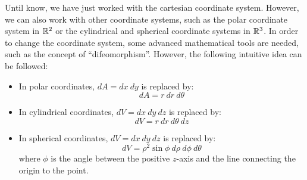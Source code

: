 Until know, we have just worked with the cartesian coordinate system. However, we can also work with other coordinate systems, such as the polar coordinate system in $\mathbb{R}^2$ or the cylindrical and spherical coordinate systems in $\mathbb{R}^3$. In order to change the coordinate system, some advanced mathematical tools are needed, such as the concept of ``difeomorphism''. However, the following intuitive idea can be followed:
\begin{itemize}
    \item In polar coordinates, $dA=dx\ dy$ is replaced by:
    \[
        dA = r\ dr\ d\theta
    \]
    \item In cylindrical coordinates, $dV=dx\ dy\ dz$ is replaced by:
    \[
        dV = r\ dr\ d\theta\ dz
    \]
    \item In spherical coordinates, $dV=dx\ dy\ dz$ is replaced by:
    \[
        dV = \rho^2 \sin\phi\ d\rho\ d\phi\ d\theta
    \]
    where $\phi$ is the angle between the positive $z$-axis and the line connecting the origin to the point.
\end{itemize}